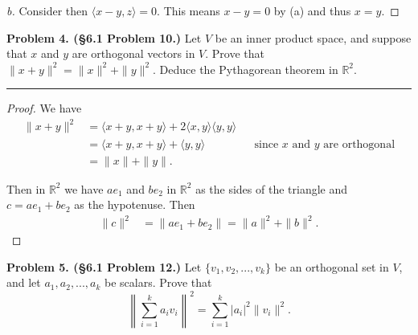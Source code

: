 \documentclass[leqno]{article}
\theoremstyle{nonumberplain}
\newtheorem{proof}{Proof}
\newcommand{\R}{\mathbb{R}}
\begin{document}
\begin{proof}[b]
Consider then $\langle x-y , z \rangle =0$.  This means $x-y=0$ by (a) and thus $x=y$.
\end{proof}

\pagebreak





\noindent\textbf{Problem 4. (\S 6.1 Problem 10.)}  Let $V$ be an inner product space, and suppose that $x$ and $y$ are orthogonal vectors in $V$. Prove that $\|x+y\|^2 = \|x\|^2 + \|y\|^2$. Deduce the Pythagorean theorem in $\R^2$.

\noindent\rule[0.5ex]{\linewidth}{1pt}

\begin{proof}
We have
\begin{align*}
\|x+y\|^2 &= \langle x+y,x+y \rangle +2 \langle x,y \rangle \langle y,y\rangle\\
&=\langle x+y,x+y \rangle + \langle y,y\rangle && \textrm{since $x$ and $y$ are orthogonal}\\
&=\|x\|+\|y\|.
\end{align*}

Then in $\R^2$ we have $a e_1$ and $b e_2$ in $\R^2$ as the sides of the triangle and $c= a e_1 + b e_2$ as the hypotenuse.   Then 
\begin{align*}
\|c\|^2&=\|a e_1 + b e_2 \| = \|a\|^2 + \|b\|^2.
\end{align*}
\end{proof}

\pagebreak




\noindent\textbf{Problem 5. (\S 6.1 Problem 12.)} Let $\{v_1,v_2,...,v_k\}$ be an orthogonal set in $V$, and let $a_1,a_2,...,a_k$ be scalars. Prove that
\[
\left\|\sum_{i=1}^k a_i v_i \right\|^2 = \sum_{i=1}^k |a_i|^2 \|v_i\|^2.
\]
\end{document}
